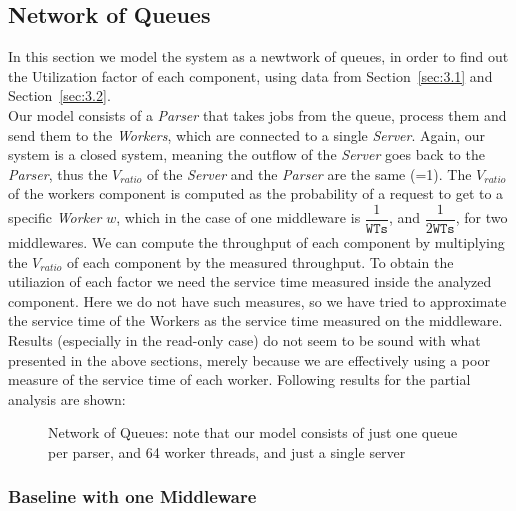 \documentclass[11pt,a4paper]{article}
\begin{document}
\newpage
\subsection{Network of Queues}

In this section we model the system as a newtwork of queues, in order to find out the Utilization factor of each component, using data from Section~\ref{sec:3.1} and Section~\ref{sec:3.2}.\\

Our model consists of a \textit{Parser} that takes jobs from the queue, process them and send them to the \textit{Workers}, which are connected to a single \textit{Server}. Again, our system is a closed system, meaning the outflow of the \textit{Server} goes back to the \textit{Parser}, thus the $V_{ratio}$ of the \textit{Server} and the \textit{Parser} are the same (=1).
The $V_{ratio}$ of the workers component is computed as the probability of a request to get to a specific \textit{Worker} $w$, which in the case of one middleware is $\dfrac{1}{\texttt{WTs}}$, and $\dfrac{1}{2\texttt{WTs}}$, for two middlewares.
We can compute the throughput of each component by multiplying the $V_{ratio}$ of each component by the measured throughput. To obtain the utiliazion of each factor we need the service time measured inside the analyzed component. Here we do not have such measures, so we have tried to approximate the service time of the Workers as the service time measured on the middleware. Results (especially in the read-only case) do not seem to be sound with what presented in the above sections, merely because we are effectively using a poor measure of the service time of each worker.
Following results for the partial analysis are shown:

\begin{figure}[!h]
  \centering
    \caption{Network of Queues: note that our model consists of just one queue per parser, and 64 worker threads, and just a single server}
    \label{fig:queue_models_newtork}
\end{figure}

\subsubsection*{Baseline with one Middleware}
\end{document}
